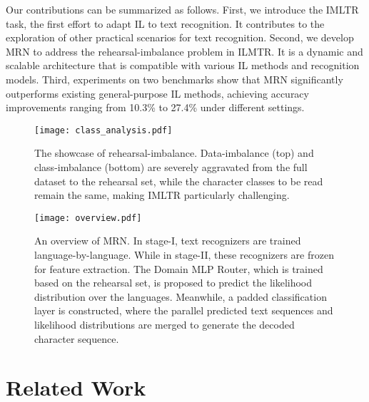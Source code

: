 \documentclass[10pt,twocolumn,letterpaper]{article}
\begin{document}
Our contributions can be summarized as follows. First, we introduce the IMLTR task, the first effort to adapt IL to text recognition. It contributes to the exploration of other practical scenarios for text recognition. Second, we develop MRN to address the rehearsal-imbalance problem in ILMTR. It is a dynamic and scalable architecture that is compatible with various IL methods and recognition models. Third, experiments on two benchmarks show that MRN significantly outperforms existing general-purpose IL methods, achieving accuracy improvements ranging from 10.3\% to 27.4\% under different settings.

\begin{figure}[]
\centering
\texttt{[image: class\_analysis.pdf]} \caption{The showcase of rehearsal-imbalance. Data-imbalance (top) and class-imbalance (bottom) are severely aggravated from the full dataset to the rehearsal set, while the character classes to be read remain the same, making IMLTR particularly challenging.}
\label{fig2:rehearsal-imbalance}
\end{figure}

\begin{figure*}[]
\centering
\texttt{[image: overview.pdf]} \caption{An overview of MRN. In stage-I, text recognizers are trained language-by-language. While in stage-II, these recognizers are frozen for feature extraction. The Domain MLP Router, which is trained based on the rehearsal set, is proposed to predict the likelihood distribution over the languages. Meanwhile, a padded classification layer is constructed, where the parallel predicted text sequences and likelihood distributions are merged to generate the decoded character sequence.}
\label{fig:overview}
\end{figure*}
\section{Related Work}
\end{document}
